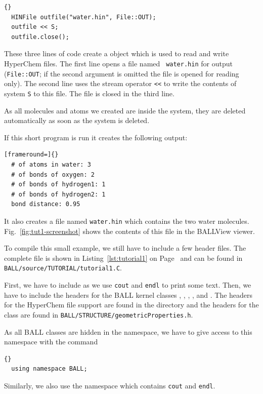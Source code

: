 \begin{lstlisting}{}
  HINFile outfile("water.hin", File::OUT);
  outfile << S;
  outfile.close();
\end{lstlisting}

\noindent
These three lines of code create a  object which is used to
read and write HyperChem files. The first line opens a file named {\tt
water.hin} for output ({\tt File::OUT}; if the second argument is omitted the
file is opened for reading only). The second line uses the stream operator 
{\tt <<}  to write the contents of system {\tt S} to 
this file. The file is closed in the third line.

\noindent 
As all molecules and atoms we created are inside the system, they are deleted
automatically as soon as the system is deleted.

If this short program is run it creates the following output:

\begin{lstlisting}[frameround=]{}
  # of atoms in water: 3
  # of bonds of oxygen: 2
  # of bonds of hydrogen1: 1
  # of bonds of hydrogen2: 1
  bond distance: 0.95
\end{lstlisting}

\noindent
It also creates a file named {\tt water.hin} which contains the two water
molecules. Fig.~\ref{fig:tut1-screenshot} shows the contents of this file
in the BALLView viewer.

To compile this small example, we still have to include a few header files.
The complete file is shown in Listing~\ref{lst:tutorial1} on
Page~\pageref{lst:tutorial1} and can be found in \mbox{{\tt
BALL/source/TUTORIAL/tutorial1.C}}.

First, we have to include  as we use {\tt cout} and {\tt endl}
to print some text. Then, we have to include the headers for the BALL kernel
classes , , , , and
. The headers for the HyperChem file support are found in the
directory  and the headers for the
 class are found in
{\tt BALL/STRUCTURE/geometricProperties.h}.

As all BALL classes are hidden in the  namespace, we have to
give access to this namespace with the command 
\begin{lstlisting}{}
  using namespace BALL;
\end{lstlisting}
Similarly, we also use the namespace  which contains {\tt cout}
and {\tt endl}.

